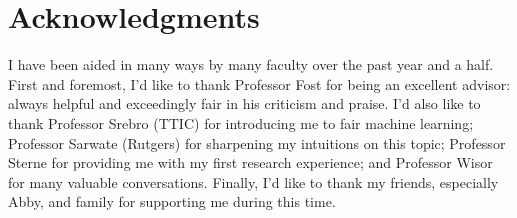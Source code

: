 

\begingroup
\let\clearpage\relax
\let\cleardoublepage\relax
\let\cleardoublepage\relax
\chapter*{Acknowledgments}
I have been aided in many ways by many faculty over the past year and a half. First and foremost, I'd like to thank Professor Fost for being an excellent advisor: always helpful and exceedingly fair in his criticism and praise. I'd also like to thank Professor Srebro (TTIC) for introducing me to fair machine learning; Professor Sarwate (Rutgers) for sharpening my intuitions on this topic; Professor Sterne for providing me with my first research experience; and Professor Wisor for many valuable conversations. Finally, I'd like to thank my friends, especially Abby, and family for supporting me during this time.

\endgroup
